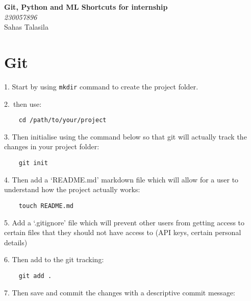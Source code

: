 


\date{}




\onehalfspacing%
\begin{titlepage}
    \centering
    \vspace*{2cm}
    \Huge{\textbf{Git, Python and ML Shortcuts for internship}} \\[1.5cm]
    \Large{\textit{230057896}\\
    Sahas Talasila} \\[1cm]
    \vfill
\end{titlepage}

\tableofcontents
\newpage

\section{Git}

1. Start by using \verb|mkdir| command to create the project folder.

2.\ then use:

\begin{lstlisting}
    cd /path/to/your/project
\end{lstlisting}

3. Then initialise using the command below so that git will actually track the changes in your project folder:

\begin{lstlisting}
    git init
\end{lstlisting}

4. Then add a `README.md' markdown file which will allow for a user to understand how the project actually works:

\begin{lstlisting}
    touch README.md
\end{lstlisting}

5. Add a `.gitignore' file which will prevent other users from getting access to certain files that they should not have access to (API keys, certain personal details)

6. Then add to the git tracking:

\begin{lstlisting}
    git add .
\end{lstlisting}

7. Then save and commit the changes with a descriptive commit message:

